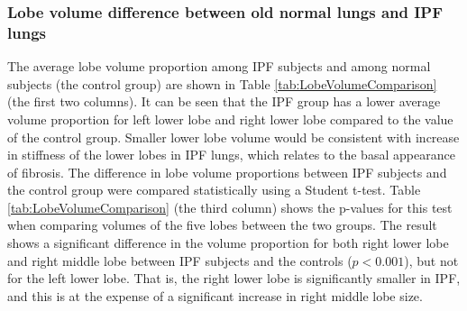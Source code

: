 
\subsubsection{Lobe volume difference between old normal lungs and IPF lungs}
The average lobe volume proportion among IPF subjects and among normal subjects (the control group) are shown in Table \ref{tab:LobeVolumeComparison} (the first two columns). It can be seen that the IPF group has a lower average volume proportion for left lower lobe and right lower lobe compared to the value of the control group. Smaller lower lobe volume would be consistent with increase in stiffness of the lower lobes in IPF lungs, which relates to the basal appearance of fibrosis. The difference in lobe volume proportions between IPF subjects and the control group were compared statistically using a Student t-test. Table \ref{tab:LobeVolumeComparison} (the third column) shows the p-values for this test when comparing volumes of the five lobes between the two groups. The result shows a significant difference in the volume proportion for both right lower lobe and right middle lobe between IPF subjects and the controls ($p<0.001$), but not for the left lower lobe. That is, the right lower lobe is significantly smaller in IPF, and this is at the expense of a significant increase in right middle lobe size.

